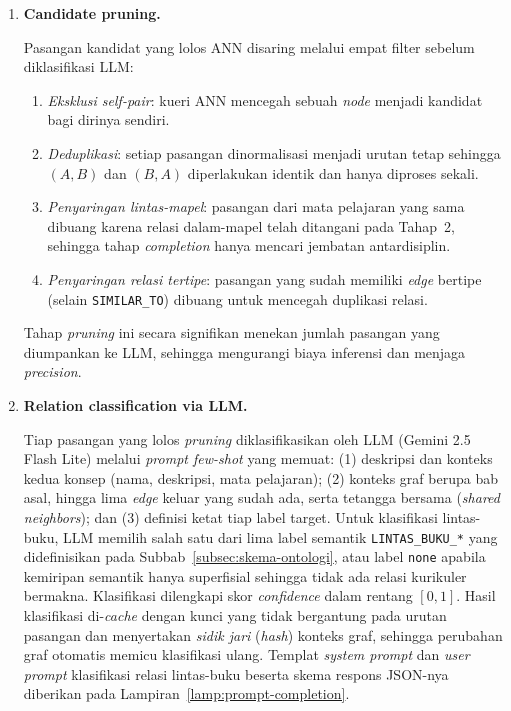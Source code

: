 \documentclass[main]{subfiles}
\begin{document}
\begin{enumerate}
  Hanya pasangan dengan $\text{sim} \geq \tau$ (dengan $\tau = 0{,}70$ untuk
  pencarian lintas-buku) yang lolos ke tahap berikutnya:
  \[
    \text{candidates}(q)
    = \bigl\{\, c \in \mathcal{C} \;\big|\; \text{sim}(\mathbf{e}_q,\, \mathbf{e}_c) \geq \tau \,\bigr\}
  \]
  Berkat indeks HNSW (Subbab~\ref{subsec:kgc}), pencarian kandidat menghindari
  perbandingan \textit{pairwise} $O(n^2)$ sehingga tetap \textit{tractable} pada
  skala ratusan hingga ribuan konsep.

  \item \textbf{Candidate pruning.}

  Pasangan kandidat yang lolos ANN disaring melalui empat filter sebelum
  diklasifikasi LLM:
  \begin{enumerate}[label=\roman*.]
    \item \textit{Eksklusi self-pair}: kueri ANN mencegah sebuah \textit{node}
      menjadi kandidat bagi dirinya sendiri.
    \item \textit{Deduplikasi}: setiap pasangan dinormalisasi menjadi urutan
      tetap sehingga $(A,B)$ dan $(B,A)$ diperlakukan identik dan hanya diproses
      sekali.
    \item \textit{Penyaringan lintas-mapel}: pasangan dari mata pelajaran yang
      sama dibuang karena relasi dalam-mapel telah ditangani pada Tahap~2,
      sehingga tahap \textit{completion} hanya mencari jembatan antardisiplin.
    \item \textit{Penyaringan relasi tertipe}: pasangan yang sudah memiliki
      \textit{edge} bertipe (selain \texttt{SIMILAR\_TO}) dibuang untuk mencegah
      duplikasi relasi.
  \end{enumerate}
  Tahap \textit{pruning} ini secara signifikan menekan jumlah pasangan yang
  diumpankan ke LLM, sehingga mengurangi biaya inferensi dan menjaga
  \textit{precision}.

  \item \textbf{Relation classification via LLM.}

  Tiap pasangan yang lolos \textit{pruning} diklasifikasikan oleh LLM
  (Gemini 2.5 Flash Lite) melalui \textit{prompt few-shot} yang memuat: (1)
  deskripsi dan konteks kedua konsep (nama, deskripsi, mata pelajaran); (2)
  konteks graf berupa bab asal, hingga lima \textit{edge} keluar yang sudah ada,
  serta tetangga bersama (\textit{shared neighbors}); dan (3) definisi ketat tiap
  label target. Untuk klasifikasi lintas-buku, LLM memilih salah satu dari lima
  label semantik \texttt{LINTAS\_BUKU\_*} yang didefinisikan pada
  Subbab~\ref{subsec:skema-ontologi}, atau label \texttt{none} apabila kemiripan
  semantik hanya superfisial sehingga tidak ada relasi kurikuler bermakna.
  Klasifikasi dilengkapi skor \textit{confidence} dalam rentang $[0, 1]$. Hasil
  klasifikasi di-\textit{cache} dengan kunci yang tidak bergantung pada urutan
  pasangan dan menyertakan \textit{sidik jari} (\textit{hash}) konteks graf,
  sehingga perubahan graf otomatis memicu klasifikasi ulang. Templat
  \textit{system prompt} dan \textit{user prompt} klasifikasi relasi lintas-buku
  beserta skema respons JSON-nya diberikan pada
  Lampiran~\ref{lamp:prompt-completion}.



\end{enumerate}
\end{document}
